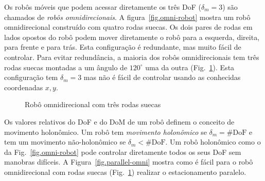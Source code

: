 Os robôs móveis que podem acessar diretamente os três DoF ($\delta_m=3$) são chamados de \emph{robôs omnidirecionais}. A figura~\ref{fig.omni-robot} mostra um robô omnidirecional construído com quatro rodas suecas. Os dois pares de rodas em lados opostos do robô podem mover diretamente o robô para a esquerda, direita, para frente e para trás. Esta configuração é redundante, mas muito fácil de controlar. Para evitar redundância, a maioria dos robôs omnidirecionais tem três rodas suecas montadas a um ângulo de $120^\circ$ uma da outra (Fig.~\ref{fig.omni3}). Esta configuração tem $\delta_m=3$ mas não é fácil de controlar usando as conhecidas coordenadas $x,y$.

\begin{figure}
\begin{center}
\end{center}
\caption{Robô omnidirecional com três rodas suecas}\label{fig.omni3}
\end{figure}

Os valores relativos do DoF e do DoM de um robô definem o conceito de movimento holonômico. Um robô tem \emph{movimento holonômico} se $\delta_m = \#\textrm{DoF}$ e tem um movimento {não-holonômico} se $\delta_m < \#\textrm{DoF}$. Um robô holonômico como o da Fig.~\ref{fig.omni-robot} pode controlar diretamente todos os seus DoF sem manobras difíceis. A Figura~\ref{fig.parallel-omni} mostra como é fácil para o robô omnidirecional com rodas suecas (Fig.~\ref{fig.omni3}) realizar o estacionamento paralelo.

